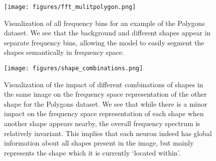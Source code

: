 \begin{figure}[h!] %
    \centering
    \texttt{[image: figures/fft\_mulitpolygon.png]} %
    \caption{Visualization of all frequency bins for an example of the Polygons dataset. We see that the background and different shapes appear in separate frequency bins, allowing the model to easily segment the shapes semantically in frequency space. }
    \label{fig:all_fft}
\end{figure}



\begin{figure}[h!] %
    \centering
    \texttt{[image: figures/shape\_combinations.png]} %
    \caption{Visualization of the impact of different combinations of shapes in the same image on the frequency space representation of the other shape for the Polygons dataset. We see that while there is a minor impact on the frequency space representation of each shape when another shape appears nearby, the overall frequency spectrum is relatively invariant. This implies that each neuron indeed has global information about all shapes present in the image, but mainly represents the shape which it is currently `located within'.}
    \label{fig:shape_combo}
\end{figure}
